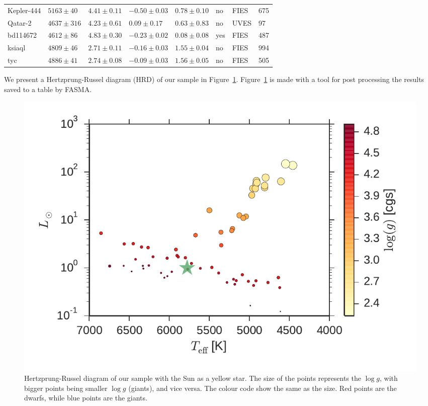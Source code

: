 \documentclass{aa}
\begin{document}
\begin{table}[htb!]
\begin{tabular}{llllllll}
   Kepler-444     &  $5163 \pm  40$      &  $4.41 \pm 0.11$    &  $-0.50 \pm 0.03$    &  $0.78 \pm 0.10$             &             no              & FIES         &  675  \\  %
      Qatar-2     &  $4637 \pm 316$      &  $4.23 \pm 0.61$    &  $ 0.09 \pm 0.17$    &  $0.63 \pm 0.83$             &             no              & UVES         &   97  \\  %
     bd114672     &  $4612 \pm  86$      &  $4.83 \pm 0.30$	   &  $-0.23 \pm 0.02$    &  $0.08 \pm 0.08$             &             yes             & FIES         &  487  \\
       ksiaql     &  $4809 \pm  46$      &  $2.71 \pm 0.11$	   &  $-0.16 \pm 0.03$    &  $1.55 \pm 0.04$             &             no              & FIES         &  994  \\
          tyc     &  $4886 \pm  41$      &  $2.74 \pm 0.08$	   &  $-0.09 \pm 0.03$    &  $1.56 \pm 0.05$             &             no              & FIES         &  505  \\
      \hline
    \end{tabular}
\end{table}
We present a Hertzprung-Russel diagram (HRD) of our sample in
Figure~\ref{fig:HRD}. Figure~\ref{fig:HRD} is made with a tool for post
processing the results saved to a table by FASMA.

\begin{figure}[tpb]
    \centering
    \includegraphics[width=1.0\linewidth]{figures/HR.pdf}
    \caption{Hertzprung-Russel diagram of our sample with the Sun as a yellow
    star. The size of the points represents the $\log g$, with bigger points
    being smaller $\log g$ (giants), and vice versa. The colour code show the
    same as the size. Red points are the dwarfs, while blue points are the
    giants.}
    \label{fig:HRD}
\end{figure}
\end{document}
